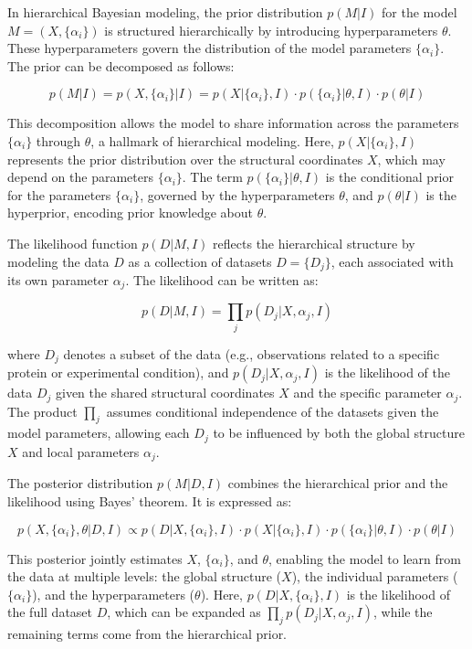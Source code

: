 \documentclass[journal=jcim,manuscript=article]{achemso}
\begin{document}
In hierarchical Bayesian modeling, the prior distribution \( p(M|I) \) for the model \( M = (X, \{\alpha_i\}) \) is structured hierarchically by introducing hyperparameters \(\theta\). These hyperparameters govern the distribution of the model parameters \(\{\alpha_i\}\). The prior can be decomposed as follows:

\[
p(M|I) = p(X, \{\alpha_i\} | I) = p(X | \{\alpha_i\}, I) \cdot p(\{\alpha_i\} | \theta, I) \cdot p(\theta | I)
\]

This decomposition allows the model to share information across the parameters \(\{\alpha_i\}\) through \(\theta\), a hallmark of hierarchical modeling. Here, \( p(X | \{\alpha_i\}, I) \) represents the prior distribution over the structural coordinates \( X \), which may depend on the parameters \(\{\alpha_i\}\). The term \( p(\{\alpha_i\} | \theta, I) \) is the conditional prior for the parameters \(\{\alpha_i\}\), governed by the hyperparameters \(\theta\), and \( p(\theta | I) \) is the hyperprior, encoding prior knowledge about \(\theta\).

The likelihood function \( p(D | M, I) \) reflects the hierarchical structure by modeling the data \( D \) as a collection of datasets \( D = \{D_j\} \), each associated with its own parameter \(\alpha_j\). The likelihood can be written as:

\[
p(D | M, I) = \prod_j p(D_j | X, \alpha_j, I)
\]

where \( D_j \) denotes a subset of the data (e.g., observations related to a specific protein or experimental condition), and \( p(D_j | X, \alpha_j, I) \) is the likelihood of the data \( D_j \) given the shared structural coordinates \( X \) and the specific parameter \(\alpha_j\). The product \(\prod_j\) assumes conditional independence of the datasets given the model parameters, allowing each \( D_j \) to be influenced by both the global structure \( X \) and local parameters \(\alpha_j\).

The posterior distribution \( p(M | D, I) \) combines the hierarchical prior and the likelihood using Bayes' theorem. It is expressed as:

\[
p(X, \{\alpha_i\}, \theta | D, I) \propto p(D | X, \{\alpha_i\}, I) \cdot p(X | \{\alpha_i\}, I) \cdot p(\{\alpha_i\} | \theta, I) \cdot p(\theta | I)
\]

This posterior jointly estimates \( X \), \(\{\alpha_i\}\), and \(\theta\), enabling the model to learn from the data at multiple levels: the global structure (\( X \)), the individual parameters (\(\{\alpha_i\}\)), and the hyperparameters (\(\theta\)). Here, \( p(D | X, \{\alpha_i\}, I) \) is the likelihood of the full dataset \( D \), which can be expanded as \(\prod_j p(D_j | X, \alpha_j, I)\), while the remaining terms come from the hierarchical prior.
\end{document}
